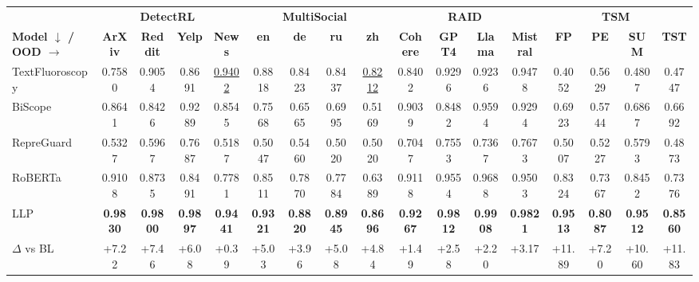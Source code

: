 \begin{tabular}{lcccccccccccccccc}
\toprule
& \multicolumn{4}{c}{\textbf{DetectRL~\citep{wu2024detectrl}}} & \multicolumn{4}{c}{\textbf{MultiSocial~\citep{macko2025multi}}} & \multicolumn{4}{c}{\textbf{RAID~\cite{dugan2024raid}}} & \multicolumn{4}{c}{\textbf{TSM~\citep{quaremba2026tsm}}} \\
\cmidrule(lr){2-5}\cmidrule(lr){6-9}\cmidrule(lr){10-13}\cmidrule(lr){14-17}
\textbf{Model $\downarrow$ / OOD $\rightarrow$} & \textbf{ArXiv} & \textbf{Reddit} & \textbf{Yelp} & \textbf{News} & \textbf{en} & \textbf{de} & \textbf{ru} & \textbf{zh} & \textbf{Cohere} & \textbf{GPT4} & \textbf{Llama} & \textbf{Mistral} & \textbf{FP} & \textbf{PE} & \textbf{SUM} & \textbf{TST} \\
\midrule
TextFluoroscopy & 0.7580 & 0.9054 & 0.8691 & \cellcolor{orange!25}\underline{0.9402} & 0.8818 & 0.8423 & 0.8437 & \cellcolor{orange!25}\underline{0.8212} & 0.8402 & 0.9296 & 0.9236 & 0.9478 & 0.4052 & 0.5629 & 0.4807 & 0.4747 \\
BiScope & 0.8641 & 0.8426 & 0.9289 & 0.8545 & 0.7568 & 0.6565 & 0.6995 & 0.5169 & 0.9039 & 0.8482 & 0.9594 & 0.9294 & 0.6923 & 0.5744 & 0.6867 & 0.6692 \\
RepreGuard & 0.5327 & 0.5967 & 0.7687 & 0.5187 & 0.5047 & 0.5460 & 0.5020 & 0.5020 & 0.7047 & 0.7553 & 0.7367 & 0.7673 & 0.5007 & 0.5227 & 0.5793 & 0.4873 \\
RoBERTa & 0.9108 & 0.8735 & 0.8491 & 0.7781 & 0.8511 & 0.7870 & 0.7784 & 0.6389 & 0.9118 & 0.9554 & 0.9688 & 0.9503 & 0.8324 & 0.7367 & 0.8452 & 0.7376 \\
\midrule
LLP & \cellcolor{cyan!25}\textbf{0.9830} & \cellcolor{cyan!25}\textbf{0.9800} & \cellcolor{cyan!25}\textbf{0.9897} & \cellcolor{cyan!25}\textbf{0.9441} & \cellcolor{cyan!25}\textbf{0.9321} & \cellcolor{cyan!25}\textbf{0.8820} & \cellcolor{cyan!25}\textbf{0.8945} & \cellcolor{cyan!25}\textbf{0.8696} & \cellcolor{cyan!25}\textbf{0.9267} & \cellcolor{cyan!25}\textbf{0.9812} & \cellcolor{cyan!25}\textbf{0.9908} & \cellcolor{cyan!25}\textbf{0.9821} & \cellcolor{cyan!25}\textbf{0.9513} & \cellcolor{cyan!25}\textbf{0.8087} & \cellcolor{cyan!25}\textbf{0.9512} & \cellcolor{cyan!25}\textbf{0.8560} \\
\hspace*{1em}$\Delta$ vs BL & \textcolor{green!60!black}{+7.22} & \textcolor{green!60!black}{+7.46} & \textcolor{green!60!black}{+6.08} & \textcolor{green!60!black}{+0.39} & \textcolor{green!60!black}{+5.03} & \textcolor{green!60!black}{+3.96} & \textcolor{green!60!black}{+5.08} & \textcolor{green!60!black}{+4.84} & \textcolor{green!60!black}{+1.49} & \textcolor{green!60!black}{+2.58} & \textcolor{green!60!black}{+2.20} & \textcolor{green!60!black}{+3.17} & \textcolor{green!60!black}{+11.89} & \textcolor{green!60!black}{+7.20} & \textcolor{green!60!black}{+10.60} & \textcolor{green!60!black}{+11.83} \\

\end{tabular}
